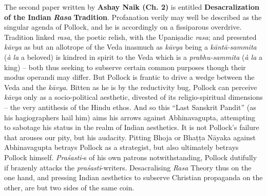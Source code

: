 The second paper written by {\bf Ashay Naik (Ch. 2)} is entitled {\bf Desacralization of the Indian} {\sl\bfseries Rasa} {\bf Tradition}. Profanation verily may well be described as the singular agenda of Pollock, and he is accordingly on a fissiparous overdrive. Tradition linked \textsl{rasa}, the poetic relish, with the Upaniṣadic \textsl{rasa}; and presented \textsl{kāvya} as but an allotrope of the Veda inasmuch as \textsl{kāvya} being a \textsl{kāntā-sammita} (\textsl{à la} a beloved) is kindred in spirit to the Veda which is a \textsl{prabhu-sammita} (\textsl{à la} a king) -- both thus seeking to subserve certain common purposes though their modus operandi may differ. But Pollock is frantic to drive a wedge between the Veda and the \textsl{kāvya}. Bitten as he is by the reductivity bug, Pollock can perceive \textsl{kāvya} only as a socio-political aesthetic, divested of its religio-spiritual dimensions -- the very antithesis of the Hindu ethos. And so this “Last Sanskrit Pandit” (as his hagiographers hail him) aims his arrows against Abhinavagupta, attempting to sabotage his status in the realm of Indian aesthetics. It is not Pollock's failure that arouses our pity, but his audacity. Pitting Bhoja or Bhaṭṭa Nāyaka against Abhinavagupta betrays Pollock as a strategist, but also ultimately betrays Pollock himself. \textsl{Praśasti}-s of his own patrons notwithstanding, Pollock dutifully if brazenly attacks the \textsl{praśasti}-writers. Desacralising \textsl{Rasa} Theory thus on the one hand, and pressing Indian aesthetics to subserve Christian propaganda on the other, are but two sides of the same coin.

